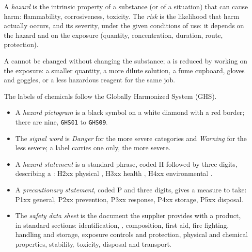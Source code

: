 \begin{definition}\label{def:b1:lab-techniques-1:hazard}
A \emph{hazard} is the intrinsic property of a substance (or
of a situation) that can cause harm: flammability, corrosiveness,
toxicity. The \emph{risk} is the likelihood that harm actually
occurs, and its severity, under the given conditions of use: it depends on
the hazard and on the exposure (quantity, concentration, duration, route,
protection).
\end{definition}

A  cannot be changed without changing the substance; a  is
reduced by working on the exposure: a smaller quantity, a more dilute
solution, a fume cupboard, gloves and goggles, or a less hazardous reagent
for the same job.

\begin{definition}\label{def:b1:lab-techniques-1:ghs}
The labels of chemicals follow the Globally Harmonized System (GHS).
\begin{itemize}
  \item A \emph{hazard pictogram} is a black symbol
        on a white diamond with a red border; there are nine, \texttt{GHS01}
        to \texttt{GHS09}.
  \item The \emph{signal word} is \emph{Danger} for the
        more severe  categories and \emph{Warning} for the less
        severe; a label carries one only, the more severe.
  \item A \emph{hazard statement} is a standard
        phrase, coded H followed by three digits, describing a :
        H2xx physical , H3xx health , H4xx environmental
        .
  \item A \emph{precautionary statement},
        coded P and three digits, gives a measure to take: P1xx general,
        P2xx prevention, P3xx response, P4xx storage, P5xx disposal.
  \item The \emph{safety data sheet} is the
        document the supplier provides with a product, in standard
        sections: identification, , composition, first aid,
        fire fighting, handling and storage, exposure controls and
        protection, physical and chemical properties, stability, toxicity,
        disposal and transport.
\end{itemize}
\end{definition}


